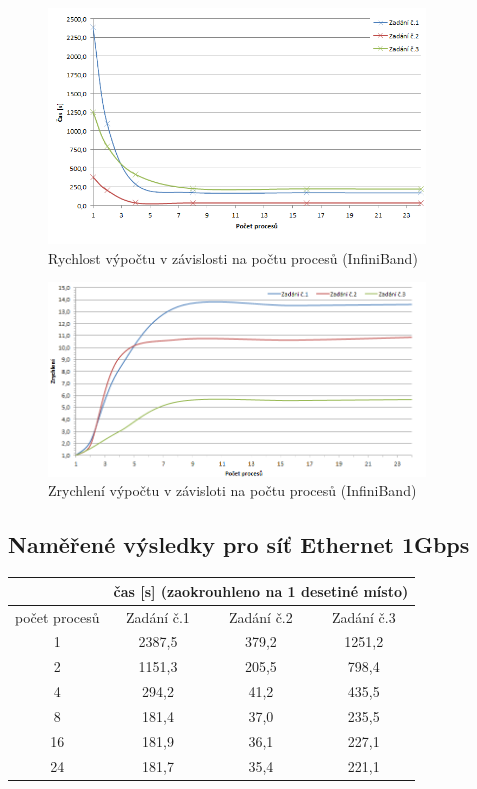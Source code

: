 \documentclass[12pt]{article}
\begin{document}
\begin{figure}[h]
\begin{center}
\includegraphics[width=100mm]{cpu_time_inifiniband.png}
\caption{Rychlost výpočtu v závislosti na počtu procesů (InfiniBand)}
\label{fig:ct_inifini}
\end{center}
\end{figure}

\begin{figure}[h]
\begin{center}
\includegraphics[width=100mm]{speedup_infini.png}
\caption{Zrychlení výpočtu v závisloti na počtu procesů (InfiniBand)}
\label{fig:speedup_inifini}
\end{center}
\end{figure}

\subsection{Naměřené výsledky pro síť Ethernet 1Gbps}

\begin{center}
\begin{tabular}{|c|c|c|c|}
\hline 
 & \multicolumn{3}{c|}{čas [s] (zaokrouhleno na 1 desetiné místo)} \\ 
\hline 
počet procesů & Zadání č.1 & Zadání č.2 & Zadání č.3 \\ 
\hline 
\hline 
1 & 2387,5 & 379,2 & 1251,2 \\ 
\hline 
2 & 1151,3 & 205,5 & 798,4 \\ 
\hline 
4 & 294,2 & 41,2 & 435,5 \\ 
\hline 
8 & 181,4 & 37,0 & 235,5 \\ 
\hline 
16 & 181,9 & 36,1 & 227,1 \\ 
\hline 
24 & 181,7 & 35,4 & 221,1 \\ 
\hline 
\end{tabular} 
\end{center}
\end{document}
